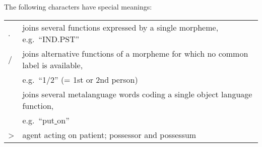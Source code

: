 \documentclass[a4paper, 11pt]{book}
\newcommand{\und}{\underline{{ }}\hspace{0.2mm}}	%
\begin{document}
\noindent The following characters have special meanings: \\

\begin{tabular}{l l}
. 		& joins several functions expressed by a single morpheme, e.g.\ “IND.PST”\\
/ 		& joins alternative functions of a morpheme for which no common label is available, \\
 		& e.g.\ “1/2” (= 1st or 2nd person)\\
\und 	& joins several metalanguage words coding a single object language function,\\
 		& e.g.\ “put\und on”\\
> 		& agent acting on patient; possessor and possessum\\
\end{tabular}
\end{document}
